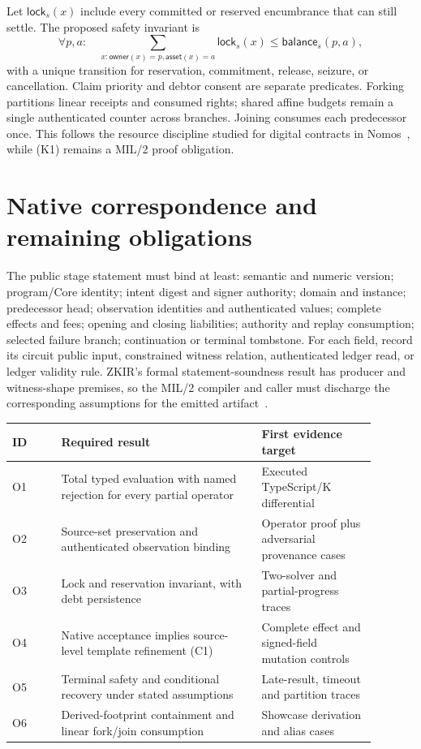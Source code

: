 \documentclass[11pt,a4paper]{article}
\theoremstyle{definition}
\begin{document}
Let $\mathsf{lock}_s(x)$ include every committed or reserved encumbrance that can still settle. The proposed safety invariant is
\[
\forall p,a:\quad
\sum_{x:\mathsf{owner}(x)=p,\mathsf{asset}(x)=a}
  \mathsf{lock}_s(x)
\le \mathsf{balance}_s(p,a),
\tag{K1}
\]
with a unique transition for reservation, commitment, release, seizure, or cancellation. Claim priority and debtor consent are separate predicates. Forking partitions linear receipts and consumed rights; shared affine budgets remain a single authenticated counter across branches. Joining consumes each predecessor once. This follows the resource discipline studied for digital contracts in Nomos~\cite{NOMOS}, while (K1) remains a MIL/2 proof obligation.

\section{Native correspondence and remaining obligations}
The public stage statement must bind at least: semantic and numeric version; program/Core identity; intent digest and signer authority; domain and instance; predecessor head; observation identities and authenticated values; complete effects and fees; opening and closing liabilities; authority and replay consumption; selected failure branch; continuation or terminal tombstone. For each field, record its circuit public input, constrained witness relation, authenticated ledger read, or ledger validity rule. ZKIR's formal statement-soundness result has producer and witness-shape premises, so the MIL/2 compiler and caller must discharge the corresponding assumptions for the emitted artifact~\cite{ZKIR}.

\begin{center}
\begin{tabular}{>{\RaggedRight\arraybackslash}p{0.12\linewidth}>{\RaggedRight\arraybackslash}p{0.49\linewidth}>{\RaggedRight\arraybackslash}p{0.28\linewidth}}
\toprule
ID & Required result & First evidence target\\
\midrule
O1 & Total typed evaluation with named rejection for every partial operator & Executed TypeScript/K differential\\
O2 & Source-set preservation and authenticated observation binding & Operator proof plus adversarial provenance cases\\
O3 & Lock and reservation invariant, with debt persistence & Two-solver and partial-progress traces\\
O4 & Native acceptance implies source-level template refinement (C1) & Complete effect and signed-field mutation controls\\
O5 & Terminal safety and conditional recovery under stated assumptions & Late-result, timeout and partition traces\\
O6 & Derived-footprint containment and linear fork/join consumption & Showcase derivation and alias cases\\
\bottomrule
\end{tabular}
\end{center}
\end{document}
